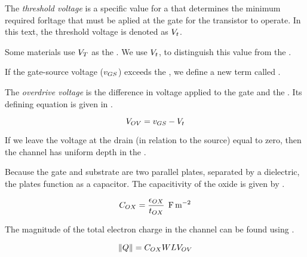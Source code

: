 \begin{definition}\label{def:Threshold_Voltage}
  The \emph{threshold voltage} is a specific value for a  that determines the minimum required forltage that must be aplied at the gate for the transistor to operate.
  In this text, the threshold voltage is denoted as $V_{t}$.

  \begin{remark}[Notation]
    Some materials use $V_{T}$ as the .
    We use $V_{t}$, to distinguish this value from the .
  \end{remark}
\end{definition}

If the gate-source voltage ($v_{GS}$) exceeds the , we define a new term called .

\begin{definition}\label{def:Overdrive_Voltage}
  The \emph{overdrive voltage} is the difference in voltage applied to the gate and the .
  Its defining equation is given in .

  \begin{equation}\label{eq:Overdrive_Voltage}
    V_{OV} = v_{GS} - V_{t}
  \end{equation}
\end{definition}

If we leave the voltage at the drain (in relation to the source) equal to zero, then the channel has uniform depth in the .

Because the gate and substrate are two parallel plates, separated by a dielectric, the plates function as a capacitor.
The capacitivity of the oxide is given by .

\begin{equation}\label{eq:MOSFET-Oxide_Capacitivity}
  C_{OX} = \frac{\epsilon_{OX}}{t_{OX}} \:\: \si{\farad\per\meter\squared}
\end{equation}

The magnitude of the total electron charge in the channel can be found using .

\begin{equation}\label{eq:MOSFET-Oxide_Electron_Charge}
  \lVert Q \rVert = C_{OX} W L V_{OV}
\end{equation}

